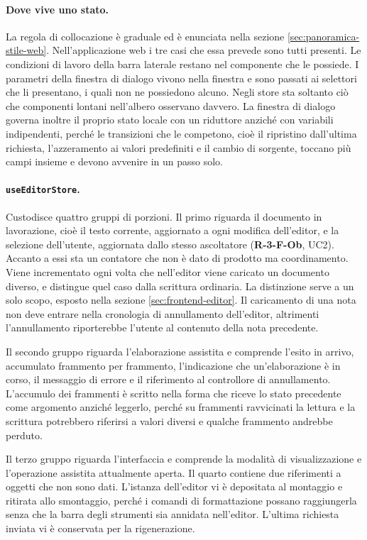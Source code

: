 \documentclass[a4paper, 10pt]{article}
\begin{document}
\paragraph{Dove vive uno stato.}
La regola di collocazione è graduale ed è enunciata nella sezione \ref{sec:panoramica-stile-web}. Nell'applicazione web i tre casi che essa prevede sono tutti presenti. Le condizioni di lavoro della barra laterale restano nel componente che le possiede. I parametri della finestra di dialogo vivono nella finestra e sono passati ai selettori che li presentano, i quali non ne possiedono alcuno. Negli store sta soltanto ciò che componenti lontani nell'albero osservano davvero. La finestra di dialogo governa inoltre il proprio stato locale con un riduttore anziché con variabili indipendenti, perché le transizioni che le competono, cioè il ripristino dall'ultima richiesta, l'azzeramento ai valori predefiniti e il cambio di sorgente, toccano più campi insieme e devono avvenire in un passo solo.

\paragraph{\texttt{useEditorStore}.}
Custodisce quattro gruppi di porzioni. Il primo riguarda il documento in lavorazione, cioè il testo corrente, aggiornato a ogni modifica dell'editor, e la selezione dell'utente, aggiornata dallo stesso ascoltatore (\textbf{R-3-F-Ob}, UC2). Accanto a essi sta un contatore che non è dato di prodotto ma coordinamento. Viene incrementato ogni volta che nell'editor viene caricato un documento diverso, e distingue quel caso dalla scrittura ordinaria. La distinzione serve a un solo scopo, esposto nella sezione \ref{sec:frontend-editor}. Il caricamento di una nota non deve entrare nella cronologia di annullamento dell'editor, altrimenti l'annullamento riporterebbe l'utente al contenuto della nota precedente.

Il secondo gruppo riguarda l'elaborazione assistita e comprende l'esito in arrivo, accumulato frammento per frammento, l'indicazione che un'elaborazione è in corso, il messaggio di errore e il riferimento al controllore di annullamento. L'accumulo dei frammenti è scritto nella forma che riceve lo stato precedente come argomento anziché leggerlo, perché su frammenti ravvicinati la lettura e la scrittura potrebbero riferirsi a valori diversi e qualche frammento andrebbe perduto.

Il terzo gruppo riguarda l'interfaccia e comprende la modalità di visualizzazione e l'operazione assistita attualmente aperta. Il quarto contiene due riferimenti a oggetti che non sono dati. L'istanza dell'editor vi è depositata al montaggio e ritirata allo smontaggio, perché i comandi di formattazione possano raggiungerla senza che la barra degli strumenti sia annidata nell'editor. L'ultima richiesta inviata vi è conservata per la rigenerazione.
\end{document}
